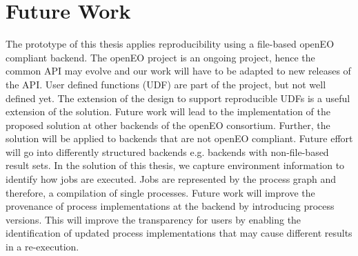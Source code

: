 \documentclass[draft,final]{vutinfth} %
\newcommand{\bgoesswe}[1]{#1}
\begin{document}
\section{Future Work}\label{FutureWork}
The prototype of this thesis applies reproducibility using a file-based openEO compliant backend. The openEO project is an ongoing project, hence the common API may evolve and our work will have to be adapted to new releases of the API. User defined functions (UDF) are part of the project, but not well defined yet. The extension of the design to support reproducible UDFs is a useful extension of the solution. Future work will lead to the implementation of the proposed solution at other backends of the openEO consortium. Further, the solution will be applied to backends that are not openEO compliant. Future effort will go into differently structured backends e.g. backends with non-file-based result sets. In the solution of this thesis, we capture environment information to identify how jobs are executed. \bgoesswe{Jobs are represented by the process graph and therefore, a compilation of single processes. Future work will improve the provenance of process implementations at the backend by introducing process versions. This will improve the transparency for users by enabling the identification of updated process implementations that may cause different results in a re-execution.}


\end{document}
